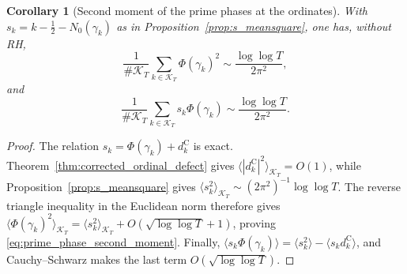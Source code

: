 \documentclass[11pt,a4paper]{article}
\makeatletter
\numberwithin{equation}{section}
\DeclareRobustCommand{\CGref}[1]{\ref{#1}}
\DeclareRobustCommand{\CGeqref}[1]{\eqref{#1}}
\let\CG@origref\ref
\let\CG@origeqref\eqref
\newcommand{\CG@gettip}[1]{\@ifundefined{CGTip@#1}{#1}{\csname CGTip@#1\endcsname}}
\DeclareRobustCommand{\CGref}[1]{\pdftooltip{\CG@origref{#1}}{\CG@gettip{#1}}}
\DeclareRobustCommand{\CGeqref}[1]{\pdftooltip{\CG@origeqref{#1}}{\CG@gettip{#1}}}
\newtheorem{corollary}[theorem]{Corollary}
\theoremstyle{definition}
\theoremstyle{remark}
\newcommand{\Nz}{N_0} %
\newcommand{\Ph}{\Phi}
\makeatother
\begin{document}
\begin{corollary}[Second moment of the prime phases at the ordinates]\label{cor:prime_phase_second_moment}
With $s_k=k-\frac12-\Nz(\gamma_k)$ as in
Proposition~\CGref{prop:s_meansquare}, one has, without RH,
\begin{equation}
\frac1{\#\mathcal K_T}\sum_{k\in\mathcal K_T}\Ph(\gamma_k)^2
\sim\frac{\log\log T}{2\pi^2},
\label{eq:prime_phase_second_moment}
\end{equation}
and
\begin{equation}
\frac1{\#\mathcal K_T}\sum_{k\in\mathcal K_T}
 s_k\Ph(\gamma_k)
\sim\frac{\log\log T}{2\pi^2}.
\label{eq:prime_phase_covariance}
\end{equation}
\end{corollary}
\begin{proof}
The relation $s_k=\Ph(\gamma_k)+d_k^{\mathrm C}$ is exact.
Theorem~\CGref{thm:corrected_ordinal_defect} gives
$\langle|d_k^{\mathrm C}|^2\rangle_{\mathcal K_T}=O(1)$, while
Proposition~\CGref{prop:s_meansquare} gives
$\langle s_k^2\rangle_{\mathcal K_T}\sim(2\pi^2)^{-1}\log\log T$.
The reverse triangle inequality in the Euclidean norm therefore gives
$\langle\Ph(\gamma_k)^2\rangle_{\mathcal K_T}
=\langle s_k^2\rangle_{\mathcal K_T}
+O(\sqrt{\log\log T}+1)$, proving
\CGeqref{eq:prime_phase_second_moment}.
Finally,
$\langle s_k\Ph(\gamma_k)\rangle
=\langle s_k^2\rangle-\langle s_kd_k^{\mathrm C}\rangle$,
and Cauchy--Schwarz makes the last term
$O(\sqrt{\log\log T})$.
\end{proof}
\end{document}
